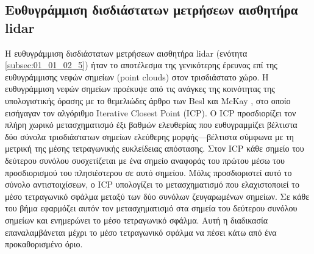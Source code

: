 \subsection{Ευθυγράμμιση δισδιάστατων μετρήσεων αισθητήρα lidar}
\label{subsection:02_02_02:1}

Η ευθυγράμμιση δισδιάστατων μετρήσεων αισθητήρα lidar (ενότητα
\ref{subsec:01_01_02_5}) ήταν το αποτέλεσμα της γενικότερης έρευνας επί της
ευθυγράμμισης νεφών σημείων (point clouds) στον τρισδιάστατο χώρο. Η
ευθυγράμμιση νεφών σημείων προέκυψε από τις ανάγκες της κοινότητας της
υπολογιστικής όρασης με το θεμελιώδες άρθρο των Besl και McKay
\cite{Besl1992c}, στο οποίο εισήγαγαν τον αλγόριθμο Iterative Closest Point
(ICP). Ο ICP προσδιορίζει τον πλήρη χωρικό μετασχηματισμό έξι βαθμών ελευθερίας
που ευθυγραμμίζει βέλτιστα δύο σύνολα τρισδιάστατων σημείων ελεύθερης
μορφής---βέλτιστα σύμφωνα με τη μετρική της μέσης τετραγωνικής ευκλείδειας
απόστασης. Στον ICP κάθε σημείο του δεύτερου συνόλου συσχετίζεται με ένα σημείο
αναφοράς του πρώτου μέσω του προσδιορισμού του πλησιέστερου σε αυτό σημείου.
Μόλις προσδιοριστεί αυτό το σύνολο αντιστοιχίσεων, ο ICP υπολογίζει το
μετασχηματισμό που ελαχιστοποιεί το μέσο τετραγωνικό σφάλμα μεταξύ των δύο
συνόλων ζευγαρωμένων σημείων. Σε κάθε του βήμα εφαρμόζει αυτόν τον
μετασχηματισμό στα σημεία του δεύτερου συνόλου σημείων και ενημερώνει το μέσο
τετραγωνικό σφάλμα. Αυτή η διαδικασία επαναλαμβάνεται μέχρι το μέσο τετραγωνικό
σφάλμα να πέσει κάτω από ένα προκαθορισμένο όριο.

